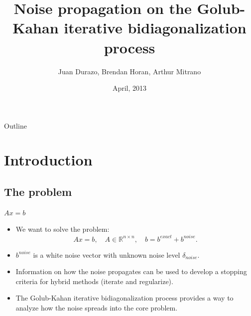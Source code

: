 \documentclass{beamer}
\title[i]{Noise propagation on the Golub-Kahan iterative bidiagonalization
process}
\subtitle{}
\author[Juan Durazo, Brendan Horan, Arthur Mitrano]
{Juan Durazo, Brendan Horan, Arthur Mitrano}
\institute[Arizona State University] %
{
  School of Mathematical and Statistical Sciences\\
  Arizona State University}
\date[APM 520] %
{April, 2013}
\begin{document}
\begin{frame}
  \titlepage
\end{frame}

\begin{frame}{Outline}
  \tableofcontents
\end{frame}





\section{Introduction}
\subsection{The problem}
\begin{frame}{$Ax=b$}
  \begin{itemize}
    \item We want to solve the problem:
      \begin{equation*}
        Ax=b, \quad A \in \mathbb{R}^{n \times n}, \quad b = b^{exact} + 
        b^{noise}.
      \end{equation*}

    \item $b^{noise}$ is a white noise vector with unknown noise level 
      $\delta_{noise}$.

    \item Information on how the noise propagates can be used to develop 
      a stopping criteria for hybrid methods (iterate and regularize).

    \item The Golub-Kahan iterative bidiagonalization process provides a way to
      analyze how the noise spreads into the core problem.
  \end{itemize}	
\end{frame}
\end{document}
